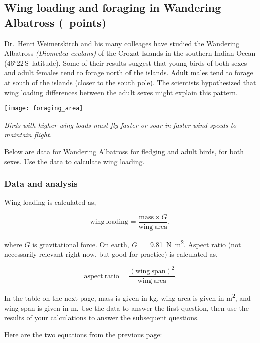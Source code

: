 \documentclass[12pt, addpoints, hidelinks]{exam}
\begin{document}

\subsection*{Wing loading and foraging in Wandering Albatross (\numpoints\ points)}


Dr.~Henri Weimerskirch and his many colleages have studied the Wandering Albatross \textit{(Diomedea exulans)} of the Crozat Islands in the southern Indian Ocean (46°22\textprime{}\,S~latitude). Some of their results suggest that young birds of both sexes and adult females tend to forage north of the islands. Adult males tend to forage at south of the islands (closer to the south pole). The scientists hypothesized that wing loading differences between the adult sexes might explain this pattern. 

\texttt{[image: foraging\_area]}

\textit{Birds with higher wing loads must fly faster or soar in faster wind speeds to maintain flight.}

Below are data for Wandering Albatross for fledging and adult birds, for both sexes. Use the data to calculate wing loading.


\subsubsection*{Data and analysis}

Wing loading is calculated as,

\vspace{-\baselineskip}

\[ \mathrm{wing~loading} = \frac{\mathrm{mass} \times G}{\mathrm{wing~area}},\]

where $G$ is gravitational force. On earth, $G =$~\qty[mode=math]{9.81}{\newton\meter^2}. Aspect ratio (not necessarily relevant right now, but good for practice) is calculated as,

\[ \mathrm{aspect~ratio} = \frac{\mathrm{(wing~span)}^2}{\mathrm{wing~area}}.\]


In the table on the next page, mass is given in \unit{kg}, wing area is given in \unit{\meter^2}, and wing span is given in \unit{\meter}. Use the data to answer the first question, then use the results of your calculations to answer the subsequent questions.

\newpage

Here are the two equations from the previous page:
\end{document}
